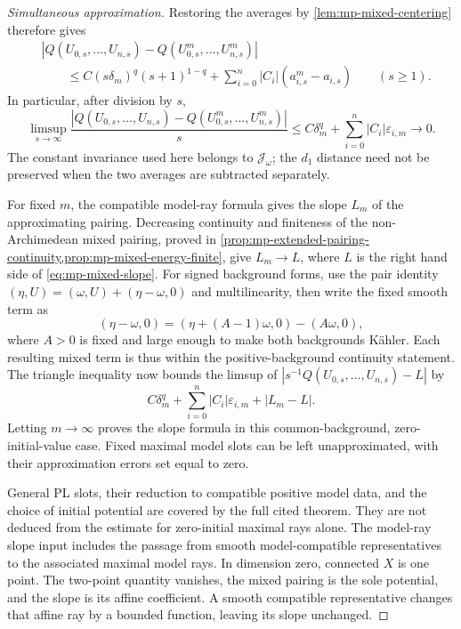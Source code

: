 \begin{proof}[Simultaneous approximation]
Restoring the averages by \cref{lem:mp-mixed-centering} therefore gives
\[
 \begin{split}
 &|Q(U_{0,s},\ldots,U_{n,s})-Q(U^m_{0,s},\ldots,U^m_{n,s})|\\
 &\qquad\leq C(s\delta_m)^q(s+1)^{1-q}
          +\sum_{i=0}^n|C_i|(a^m_{i,s}-a_{i,s})\qquad(s\geq1).
 \end{split}
\tag{60.24b}\label{eq:mp-mixed-simultaneous-error}
\]
In particular, after division by $s$,
\[
 \limsup_{s\to\infty}
 \frac{|Q(U_{0,s},\ldots,U_{n,s})-Q(U^m_{0,s},\ldots,U^m_{n,s})|}{s}
 \leq C\delta_m^q+\sum_{i=0}^n|C_i|\varepsilon_{i,m}
 \longrightarrow0.
\]
The constant invariance used here belongs to $\mathcal J_\omega$; the $d_1$ distance need not be preserved when the two averages are subtracted separately.

For fixed $m$, the compatible model-ray formula gives the slope $L_m$ of the approximating pairing. Decreasing continuity and finiteness of the non-Archimedean mixed pairing, proved in \cref{prop:mp-extended-pairing-continuity,prop:mp-mixed-energy-finite}, give $L_m\to L$, where $L$ is the right hand side of \eqref{eq:mp-mixed-slope}. For signed background forms, use the pair identity $(\eta,U)=(\omega,U)+(\eta-\omega,0)$ and multilinearity, then write the fixed smooth term as
\[
 (\eta-\omega,0)=(\eta+(A-1)\omega,0)-(A\omega,0),
\]
where $A>0$ is fixed and large enough to make both backgrounds K\"ahler. Each resulting mixed term is thus within the positive-background continuity statement. The triangle inequality now bounds the limsup of $|s^{-1}Q(U_{0,s},\ldots,U_{n,s})-L|$ by
\[
          C\delta_m^q+\sum_{i=0}^n|C_i|\varepsilon_{i,m}+|L_m-L|.
\]
Letting $m\to\infty$ proves the slope formula in this common-background, zero-initial-value case. Fixed maximal model slots can be left unapproximated, with their approximation errors set equal to zero.

General PL slots, their reduction to compatible positive model data, and the choice of initial potential are covered by the full cited theorem. They are not deduced from the estimate for zero-initial maximal rays alone. The model-ray slope input includes the passage from smooth model-compatible representatives to the associated maximal model rays. In dimension zero, connected $X$ is one point. The two-point quantity vanishes, the mixed pairing is the sole potential, and the slope is its affine coefficient. A smooth compatible representative changes that affine ray by a bounded function, leaving its slope unchanged.
\end{proof}

